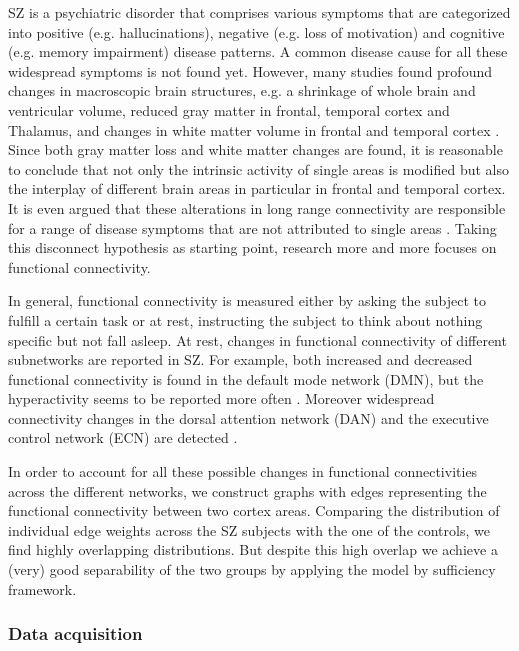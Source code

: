 \documentclass[\ifafour a4paper,12pt,\else a5paper,10pt,\fi%
onecolumn,oneside,article,%
british%
]{memoir}
\theoremstyle{remark}
\theoremstyle{innote}
\newcommand*{\citep}{\parencites}
\renewcommand*{\|}{\mathpunct{|}}
\theoremstyle{plain}
\begin{document}
SZ is a psychiatric disorder that comprises various symptoms that
are categorized into positive (e.g. hallucinations), negative (e.g.
loss of motivation) and cognitive (e.g. memory impairment) disease
patterns. A common disease cause for all these widespread symptoms
is not found yet. However, many studies found profound changes in
macroscopic brain structures, e.g. a shrinkage of whole brain and
ventricular volume, reduced gray matter in frontal, temporal cortex
and Thalamus, and changes in white matter volume in frontal and temporal
cortex \citep{Shenton2010,Wright2009,Wright2010}. Since both gray
matter loss and white matter changes are found, it is reasonable to
conclude that not only the intrinsic activity of single areas is modified
but also the interplay of different brain areas in particular in frontal
and temporal cortex. It is even argued that these alterations in long
range connectivity are responsible for a range of disease symptoms
that are not attributed to single areas \citep{Friston1995}. Taking
this disconnect hypothesis as starting point, research more and more
focuses on functional connectivity. 

In general, functional connectivity is measured either by asking the
subject to fulfill a certain task or at rest, instructing the subject
to think about nothing specific but not fall asleep. At rest, changes
in functional connectivity of different subnetworks are reported in
SZ. For example, both increased and decreased functional connectivity
is found in the default mode network (DMN), but the hyperactivity
seems to be reported more often \citep{Hu2017}. Moreover widespread
connectivity changes in the dorsal attention network (DAN) and the
executive control network (ECN) are detected \citep{Woodward2011,Yu2012}.

In order to account for all these possible changes in functional connectivities
across the different networks, we construct graphs with edges representing
the functional connectivity between two cortex areas. Comparing the
distribution of individual edge weights across the SZ subjects with
the one of the controls, we find highly overlapping distributions.
But despite this high overlap we achieve a (very) good separability
of the two groups by applying the model by sufficiency framework.

\subsubsection{Data acquisition}
\end{document}
